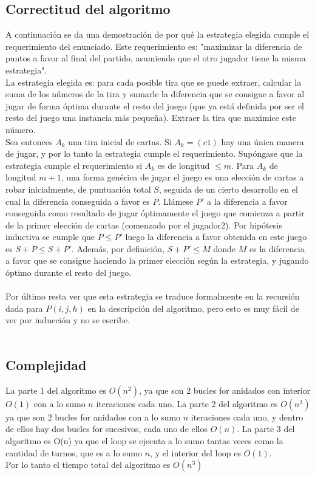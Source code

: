 \subsection{Correctitud del algoritmo}
A continuaci\'on se da una demostraci\'on de por qu\'e la estrategia elegida cumple el requerimiento del enunciado. Este requerimiento es: "maximizar la diferencia de puntos a favor al final del partido, asumiendo que el otro jugador tiene la misma estrategia".\\
La estrategia elegida es: para cada posible tira que se puede extraer, calcular la suma de los n\'umeros de la tira y sumarle la diferencia que se consigue a favor al jugar de forma \'optima durante el resto del juego (que ya est\'a definida por ser el resto del juego una instancia m\'as peque\~na). Extraer la tira que maximice este n\'umero.\\
Sea entonces $A_{k}$ una tira inicial de cartas. Si $A_{k}=(c1)$ hay una \'unica manera de jugar, y por lo tanto la estrategia cumple el requerimiento. Sup\'ongase que la estrategia cumple el requerimiento si $A_{k}$ es de longitud $\le m$. Para $A_{k}$ de longitud $m+1$, una forma gen\'erica de jugar el juego es una elecci\'on de cartas a robar inicialmente, de puntuaci\'on total $S$, seguida de un cierto desarrollo en el cual la diferencia conseguida a favor es $P$. Ll\'amese $P'$ a la diferencia a favor conseguida como resultado de jugar \'optimamente el juego que comienza a partir de la primer elecci\'on de cartas (comenzado por el jugador2). Por hip\'otesis inductiva se cumple que $P \le P'$ luego la diferencia a favor obtenida en este juego es $S+P \le S+P'$. Adem\'as, por definici\'on, $S+P' \le M$ donde $M$ es la diferencia a favor que se consigue haciendo la primer elecci\'on seg\'un la estrategia, y jugando \'optimo durante el resto del juego.\\
\\
 Por \'ultimo resta ver que esta estrategia se traduce formalmente en la recursi\'on dada para $P(i,j,h)$ en la descripci\'on del algoritmo, pero esto es muy f\'acil de ver por inducci\'on y no se escribe.\\
\\
\subsection{Complejidad}
La parte 1 del algoritmo es $O(n^{2})$, ya que son 2 bucles for anidados con interior $O(1)$ con a lo sumo $n$ iteraciones cada uno.
La parte 2 del algoritmo es $O(n^{3})$ ya que son 2 bucles for anidados con a lo sumo $n$ iteraciones cada uno, y dentro de ellos hay dos bucles for sucesivos, cada uno de ellos $O(n)$.
La parte 3 del algoritmo es O(n) ya que el loop se ejecuta a lo sumo tantas veces como la cantidad de turnos, que es a lo sumo $n$, y el interior del loop es $O(1)$.\\
Por lo tanto el tiempo total del algoritmo es $O(n^3)$

